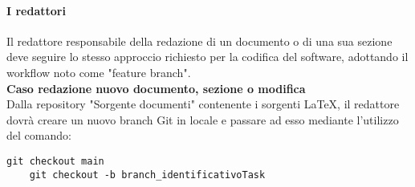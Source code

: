 


\paragraph{I redattori}

Il redattore responsabile della redazione di un documento o di una sua sezione deve seguire lo stesso approccio richiesto per la codifica del software, adottando il workflow noto come "feature branch".\\
\vspace{0.1cm}
\textbf{Caso redazione nuovo documento, sezione o modifica}\\
Dalla repository  "Sorgente documenti" contenente i sorgenti \LaTeX, il redattore dovrà creare un nuovo branch Git in locale e passare ad esso mediante l'utilizzo del comando:
\begin{lstlisting}[style=code]
    git checkout main
    git checkout -b branch_identificativoTask 
    \end{lstlisting}

